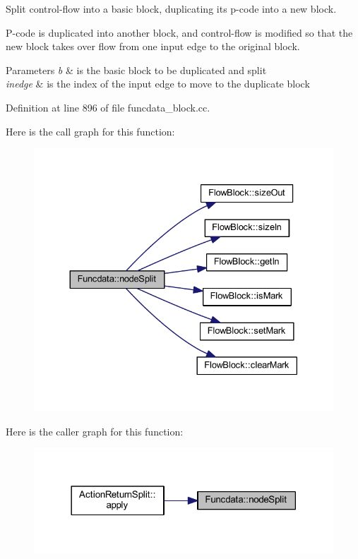 Split control-\/flow into a basic block, duplicating its p-\/code into a new block. 

P-\/code is duplicated into another block, and control-\/flow is modified so that the new block takes over flow from one input edge to the original block. 
\begin{DoxyParams}{Parameters}
{\em b} & is the basic block to be duplicated and split \\
\hline
{\em inedge} & is the index of the input edge to move to the duplicate block \\
\hline
\end{DoxyParams}


Definition at line 896 of file funcdata\+\_\+block.\+cc.

Here is the call graph for this function\+:
\nopagebreak
\begin{figure}[H]
\begin{center}
\leavevmode
\includegraphics[width=330pt]{class_funcdata_a3e19baf8aa1db2ecde4fd12075da0694_cgraph}
\end{center}
\end{figure}
Here is the caller graph for this function\+:
\nopagebreak
\begin{figure}[H]
\begin{center}
\leavevmode
\includegraphics[width=318pt]{class_funcdata_a3e19baf8aa1db2ecde4fd12075da0694_icgraph}
\end{center}
\end{figure}
\mbox{\label{class_funcdata_a0901453d881b28305cb071a3cc8a7fe9}} 
